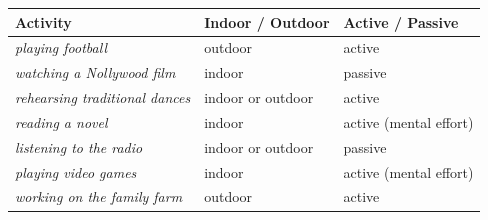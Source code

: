 \documentclass[11pt]{article}
\newcommand{\eng}[1]{\ifmmode\text{\textit{#1}}\else\begingroup\selectlanguage{english}\itshape #1\endgroup\fi}
\begin{document}
\begin{center}
\begin{tabularx}{\linewidth}{|X|X|X|}
\hline
\rowcolor{popblueL} \textbf{Activity} & \textbf{Indoor / Outdoor} & \textbf{Active / Passive} \\
\hline
\eng{playing football} & outdoor & active \\
\hline
\eng{watching a Nollywood film} & indoor & passive \\
\hline
\eng{rehearsing traditional dances} & indoor or outdoor & active \\
\hline
\eng{reading a novel} & indoor & active (mental effort) \\
\hline
\eng{listening to the radio} & indoor or outdoor & passive \\
\hline
\eng{playing video games} & indoor & active (mental effort) \\
\hline
\eng{working on the family farm} & outdoor & active \\
\hline
\end{tabularx}
\end{center}
\end{document}
